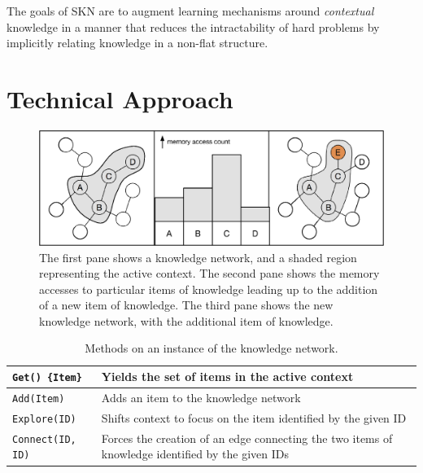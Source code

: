 \documentclass[11pt,letterpaper]{article}
\begin{document}
The goals of SKN are to augment learning mechanisms around \emph{contextual}
knowledge in a manner that reduces the intractability of hard problems by
implicitly relating knowledge in a non-flat structure.


\section{Technical Approach}

\begin{figure}[h]
\centering
\includegraphics[scale=.5]{sf_add.eps}
\caption{The first pane shows a knowledge network, and a shaded region
  representing the active context. The second pane shows the memory accesses
  to particular items of knowledge leading up to the addition of a new item
  of knowledge. The third pane shows the new knowledge network, with the
  additional item of knowledge.}
\label{fig:sf_add}
\end{figure}

\begin{table}[h]
  \begin{center}
  \begin{tabular}{|l|p{4in}|}
    \hline
    {\tt Get() \{Item\}}  & Yields the set of items in the active context \\
                            \hline
    {\tt Add(Item)}       & Adds an item to the knowledge network \\ \hline
    {\tt Explore(ID)}     & Shifts context to focus on the item identified
                            by the given ID \\ \hline
    {\tt Connect(ID, ID)} & Forces the creation of an edge connecting the
                            two items of knowledge identified by the given
                            IDs \\
    \hline
  \end{tabular}
  \end{center}
\caption{Methods on an instance of the knowledge network.}
\label{tab:sf_get}
\end{table}
\end{document}
